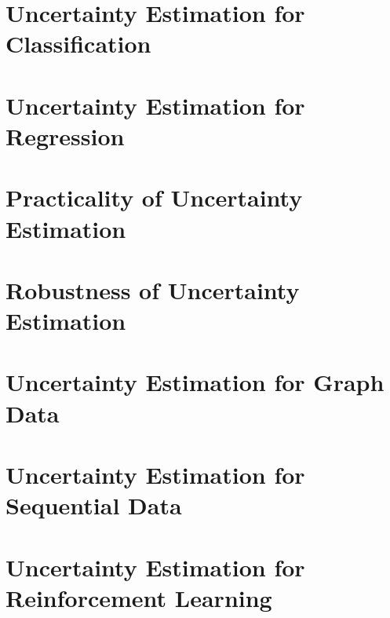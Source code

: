 \documentclass[%
]{tumDiss}
\begin{document}
\appendix

\chapter{Uncertainty Estimation for Classification}

\chapter{Uncertainty Estimation for Regression}

\chapter{Practicality of Uncertainty Estimation}

\chapter{Robustness of Uncertainty Estimation}

\chapter{Uncertainty Estimation for Graph Data}

\chapter{Uncertainty Estimation for Sequential Data}

\chapter{Uncertainty Estimation for Reinforcement Learning}

\end{document}
